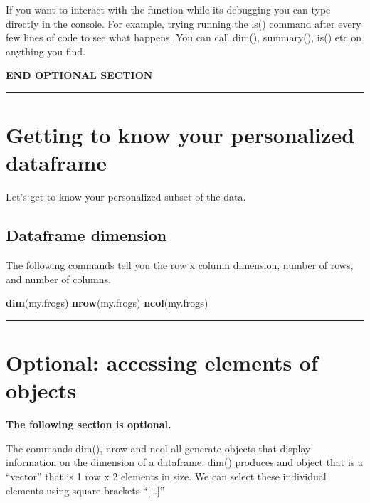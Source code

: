 \documentclass[]{book}
\newenvironment{Shaded}{\begin{snugshade}}{\end{snugshade}}
\newcommand{\KeywordTok}[1]{\textcolor[rgb]{0.13,0.29,0.53}{\textbf{#1}}}
\newcommand{\NormalTok}[1]{#1}
\theoremstyle{definition}
\theoremstyle{definition}
\theoremstyle{definition}
\theoremstyle{remark}
\begin{document}
If you want to interact with the function while its debugging you can
type directly in the console. For example, trying running the ls()
command after every few lines of code to see what happens. You can call
dim(), summary(), is() etc on anything you find.

\textbf{END OPTIONAL SECTION}

\begin{center}\rule{0.5\linewidth}{\linethickness}\end{center}

\section{Getting to know your personalized
dataframe}\label{getting-to-know-your-personalized-dataframe}

Let's get to know your personalized subset of the data.

\subsection{Dataframe dimension}\label{dataframe-dimension}

The following commands tell you the row x column dimension, number of
rows, and number of columns.

\begin{Shaded}
\begin{Highlighting}[]
\KeywordTok{dim}\NormalTok{(my.frogs)}
\KeywordTok{nrow}\NormalTok{(my.frogs)}
\KeywordTok{ncol}\NormalTok{(my.frogs)}
\end{Highlighting}
\end{Shaded}

\begin{center}\rule{0.5\linewidth}{\linethickness}\end{center}

\section{Optional: accessing elements of
objects}\label{optional-accessing-elements-of-objects}

\textbf{The following section is optional.}

The commands dim(), nrow and ncol all generate objects that display
information on the dimension of a dataframe. dim() produces and object
that is a ``vector'' that is 1 row x 2 elements in size. We can select
these individual elements using square brackets ``{[}\ldots{}{]}''
\end{document}
